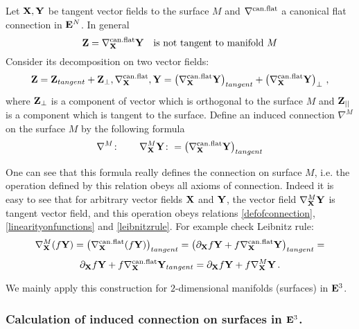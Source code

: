 \documentclass[12pt]{article}
\theoremstyle{theorem}
\numberwithin{equation}{section}
\begin{document}
    Let ${\bf X},{\bf Y}$ be tangent vector fields to the surface $M$ and $\nabla^{\rm can.flat}$ a canonical flat
    connection in ${\bf E}^N$.
    In general
            \begin{equation}\label{nottangent!}
                {\bf Z}=    \nabla^{\rm can.flat}_{\bf X}{\bf Y}\quad \hbox{is not tangent to manifold $M$}
                \end{equation}
                Consider its decomposition on two vector fields:
                          \begin{equation}\label{nottangent!2}
             {\bf Z}={\bf Z}_{tangent}+{\bf Z}_\bot,       \nabla^{\rm can.flat}_{\bf X},{\bf Y}=
                    \left(\nabla^{\rm can.flat}_{\bf X}{\bf Y}\right)_{tangent}+
                    \left(\nabla^{\rm can.flat}_{\bf X}{\bf Y}\right)_{\bot}\,,
                \end{equation}
where ${\bf Z}_{\bot}$ is a component of vector which is orthogonal to the surface $M$ and ${\bf Z}_{||}$ is a component which
is tangent to the surface. Define an induced connection $\nabla^{M}$ on the surface $M$ by the following formula
\begin{equation}\label{inducedconnection1}
\nabla^{M}\colon\qquad \nabla^{M}_{\bf X}{\bf Y} \colon =
\left(\nabla^{\rm can.flat}_{\bf X}{\bf Y}\right)_{tangent}
\end{equation}

One can see that this formula really defines the connection on surface
  $M$, i.e. the operation defined by this relation obeys all 
axioms of connection.  Indeed it is easy to see that
for arbitrary vector fields ${\bf X}$ and ${\bf Y}$, the vector field
$\nabla^M_{\bf X} {\bf Y}$ is tangent vector field,
and this operation obeys relations
\eqref{defofconnection}, 
\eqref{linearityonfunctions}
and \eqref{leibnitzrule}. For example check Leibnitz rule:
             $$
  \nabla^M_{\bf X}(f{\bf Y})=\left(\nabla^{\rm can.flat}_{\bf X}(f{\bf Y})\right)_{tangent}=
  \left(\partial_{\bf X} f{\bf Y}+f\nabla^{\rm can.flat}_{\bf X}{\bf Y}\right)_{tangent}=
            $$
            \begin{equation*}
     \partial_{\bf X} f{\bf Y}+f\nabla^{\rm can.flat}_{\bf X}{\bf Y}_{tangent}=
     \partial_{\bf X} f{\bf Y}+f\nabla^M_{\bf X}{\bf Y}\,.
             \end{equation*}


    We mainly apply this construction for $2$-dimensional manifolds
(surfaces) in ${\bf E}^3$.


\subsubsection {Calculation of induced connection on surfaces in ${\bf E}^3$.}
\end{document}
